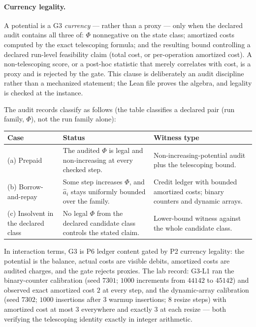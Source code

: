 \documentclass[11pt]{article}
\theoremstyle{definition}
\begin{document}
\paragraph{Currency legality.} A potential is a G3 \emph{currency} --- rather than a proxy --- only
when the declared audit contains all three of: $\Phi$ nonnegative on the state class; amortized costs
computed by the exact telescoping formula; and the resulting bound controlling a declared run-level
feasibility claim (total cost, or per-operation amortized cost). A non-telescoping score, or a
post-hoc statistic that merely correlates with cost, is a proxy and is rejected by the gate. This
clause is deliberately an audit discipline rather than a mechanized statement; the Lean file proves
the algebra, and legality is checked at the instance.

The audit records classify as follows (the table classifies a declared pair (run family, $\Phi$), not
the run family alone):

\begin{center}
\footnotesize
\begin{tabularx}{\textwidth}{@{}lXX@{}}
\toprule
Case & Status & Witness type \\
\midrule
(a) Prepaid & The audited $\Phi$ is legal and non-increasing at every checked step. &
Non-increasing-potential audit plus the telescoping bound. \\
(b) Borrow-and-repay & Some step increases $\Phi$, and $\widehat{a}_i$ stays uniformly bounded over
the family. & Credit ledger with bounded amortized costs; binary counters and dynamic arrays. \\
(c) Insolvent in the declared class & No legal $\Phi$ from the declared candidate class controls the
stated claim. & Lower-bound witness against the whole candidate class. \\
\bottomrule
\end{tabularx}
\end{center}

In interaction terms, G3 is P6 ledger content gated by P2 currency legality: the potential is the
balance, actual costs are visible debits, amortized costs are audited charges, and the gate rejects
proxies. The lab record: G3-L1 ran the binary-counter calibration (seed $7301$; $1000$ increments from
$44142$ to $45142$) and observed exact amortized cost $2$ at every step, and the dynamic-array
calibration (seed $7302$; $1000$ insertions after $3$ warmup insertions; $8$ resize steps) with
amortized cost at most $3$ everywhere and exactly $3$ at each resize --- both verifying the
telescoping identity exactly in integer arithmetic.
\end{document}
